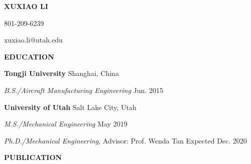 \documentclass[11pt, letterpaper]{article}
\begin{document}
\begin{center}
   \textbf{\Large XUXIAO LI}

   \large 801-209-6239

   \large xuxiao.li@utah.edu
   \paraspace
\end{center}

\textbf{EDUCATION}

\fullrule

\textbf{Tongji University} 
\hfill
Shanghai, China

\textit{B.S./Aircraft Manufacturing Engineering} \hfill Jun. 2015

\vspace{6pt}
\textbf{University of Utah} \hfill Salt Lake City, Utah

\textit{M.S./Mechanical Engineering} \hfill May 2019

\textit{Ph.D./Mechanical Engineering}, Advisor: Prof. Wenda Tan \hfill Expected Dec. 2020
\paraspace

\textbf{PUBLICATION}

\fullrule
\end{document}
